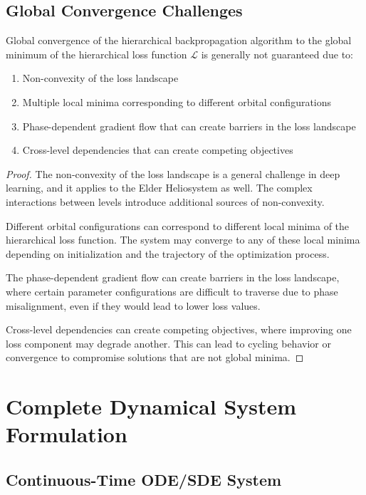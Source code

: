 \subsection{Global Convergence Challenges}

\begin{theorem}
Global convergence of the hierarchical backpropagation algorithm to the global minimum of the hierarchical loss function $\mathcal{L}$ is generally not guaranteed due to:
\begin{enumerate}
    \item Non-convexity of the loss landscape
    \item Multiple local minima corresponding to different orbital configurations
    \item Phase-dependent gradient flow that can create barriers in the loss landscape
    \item Cross-level dependencies that can create competing objectives
\end{enumerate}
\end{theorem}

\begin{proof}
The non-convexity of the loss landscape is a general challenge in deep learning, and it applies to the Elder Heliosystem as well. The complex interactions between levels introduce additional sources of non-convexity.

Different orbital configurations can correspond to different local minima of the hierarchical loss function. The system may converge to any of these local minima depending on initialization and the trajectory of the optimization process.

The phase-dependent gradient flow can create barriers in the loss landscape, where certain parameter configurations are difficult to traverse due to phase misalignment, even if they would lead to lower loss values.

Cross-level dependencies can create competing objectives, where improving one loss component may degrade another. This can lead to cycling behavior or convergence to compromise solutions that are not global minima.
\end{proof}

\section{Complete Dynamical System Formulation}

\subsection{Continuous-Time ODE/SDE System}

